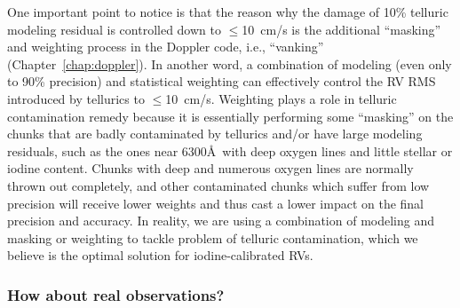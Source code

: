One important point to notice is that the reason why the damage of
10\% telluric modeling residual is controlled down to $\leq$10~cm/s is
the additional ``masking'' and weighting process in the Doppler code,
i.e., ``vanking'' (Chapter~\ref{chap:doppler}). In another word, a
combination of modeling (even only to 90\% precision) and statistical
weighting can effectively control the RV RMS introduced by tellurics
to $\leq$10~cm/s. Weighting plays a role in telluric contamination
remedy because it is essentially performing some ``masking'' on the
chunks that are badly contaminated by tellurics and/or have large
modeling residuals, such as the ones near 6300\AA\ with deep oxygen
lines and little stellar or iodine content.  Chunks with deep and
numerous oxygen lines are normally thrown out completely, and other
contaminated chunks which suffer from low precision will receive lower
weights and thus cast a lower impact on the final precision and
accuracy. In reality, we are using a combination of modeling and
masking or weighting to tackle problem of telluric contamination,
which we believe is the optimal solution for iodine-calibrated RVs.

\subsubsection{How about real observations?}\label{keck:telluric:real}

